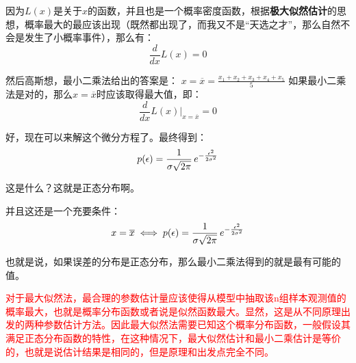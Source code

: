 \documentclass[12pt]{article}
\begin{document}
因为$L(x)$是关于$x$的函数，并且也是一个概率密度函数，根据\textbf{极大似然估计}的思想，概率最大的最应该出现（既然都出现了，而我又不是“天选之才”，那么自然不会是发生了小概率事件），那么有：
$$
\frac{d}{dx}L(x) = 0
$$

然后高斯想，最小二乘法给出的答案是：
$x=\overline{x}=\frac{x_1+x_2+x_3+x_4+x_5}{5}$
如果最小二乘法是对的，那么$x=\overline{x}$时应该取得最大值，即：
$$
\frac{d}{dx}L(x)|_{x=\overline{x}}=0
$$

好，现在可以来解这个微分方程了。最终得到：
$$
p(\epsilon)={1 \over \sigma\sqrt{2\pi} }\,e^{- {{\epsilon^2 \over 2\sigma^2}}}
$$

这是什么？这就是正态分布啊。

并且这还是一个充要条件：
$$
x=\overline{x}\iff p(\epsilon)={1 \over \sigma\sqrt{2\pi} }\,e^{- {{\epsilon^2 \over 2\sigma^2}}}
$$

也就是说，如果误差的分布是正态分布，那么最小二乘法得到的就是最有可能的值。

\textcolor{red}{对于最大似然法，最合理的参数估计量应该使得从模型中抽取该n组样本观测值的概率最大，也就是概率分布函数或者说是似然函数最大。显然，这是从不同原理出发的两种参数估计方法。因此最大似然法需要已知这个概率分布函数，一般假设其满足正态分布函数的特性，在这种情况下，最大似然估计和最小二乘估计是等价的，也就是说估计结果是相同的，但是原理和出发点完全不同。}



\end{document}
